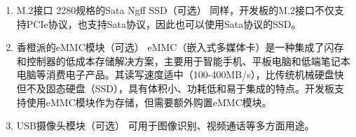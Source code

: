 \begin{enumerate}
\item
  M.2接口 2280规格的Sata Ngff SSD（可选）
  同样，开发板的M.2接口不仅支持PCIe协议，也支持Sata协议，因此也可以使用Sata协议的SSD。
\item
  香橙派的eMMC模块（可选）
  eMMC（嵌入式多媒体卡）是一种集成了闪存和控制器的低成本存储解决方案，主要用于智能手机、平板电脑和低端笔记本电脑等消费电子产品。其读写速度适中（100-400MB/s），比传统机械硬盘快但不及固态硬盘（SSD），具有体积小、功耗低和易于集成的特点。开发板支持使用eMMC模块作为存储，但需要额外购置eMMC模块。
\item
  USB摄像头模块（可选） 可用于图像识别、视频通话等多方面用途。

\end{enumerate}
